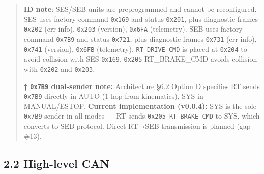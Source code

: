 \documentclass[12pt,a4paper,oneside]{report}
\begin{document}
\begin{quote}
\textbf{ID note}: SES/SEB units are preprogrammed and cannot be reconfigured.
SES uses factory command \texttt{0x169} and status \texttt{0x201}, plus
diagnostic frames \texttt{0x202} (err info), \texttt{0x203} (version),
\texttt{0x6FA} (telemetry). SEB uses factory command \texttt{0x7B9} and status
\texttt{0x721}, plus diagnostic frames \texttt{0x731} (err info), \texttt{0x741}
(version), \texttt{0x6FB} (telemetry). \texttt{RT\_DRIVE\_CMD} is placed at
\texttt{0x204} to avoid collision with SES \texttt{0x169}. \texttt{0x205}
RT\_BRAKE\_CMD avoids collision with \texttt{0x202} and \texttt{0x203}.

\textbf{† \texttt{0x7B9} dual-sender note:} Architecture §6.2 Option D specifies
RT sends \texttt{0x7B9} directly in AUTO (1-hop from kinematics), SYS in
MANUAL/ESTOP. \textbf{Current implementation (v0.0.4):} SYS is the sole
\texttt{0x7B9} sender in all modes --- RT sends \texttt{0x205\ RT\_BRAKE\_CMD}
to SYS, which converts to SEB protocol. Direct RT→SEB transmission is planned
(gap \#13).
\end{quote}

\subsection{2.2 High-level CAN}\label{high-level-can}
\end{document}
